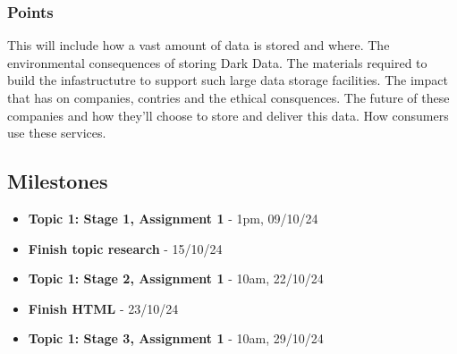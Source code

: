 \documentclass{article}
\begin{document}
        \subsubsection{Points}
        This will include how a vast amount of data is stored and where. 
        The environmental consequences of storing Dark Data.
        The materials required to build the infastructutre to support such large data storage facilities.
        The impact that has on companies, contries and the ethical consquences. 
        The future of these companies and how they'll choose to store and deliver this data.
        How consumers use these services.

        

\subsection{Milestones}
    \begin{itemize}
        \item \textbf{Topic 1: Stage 1, Assignment 1} - 1pm, 09/10/24
        \item \textbf{Finish topic research} - 15/10/24
        \item \textbf{Topic 1: Stage 2, Assignment 1} - 10am, 22/10/24
        \item \textbf{Finish HTML} - 23/10/24
        \item \textbf{Topic 1: Stage 3, Assignment 1} - 10am, 29/10/24
    \end{itemize}
\end{document}
